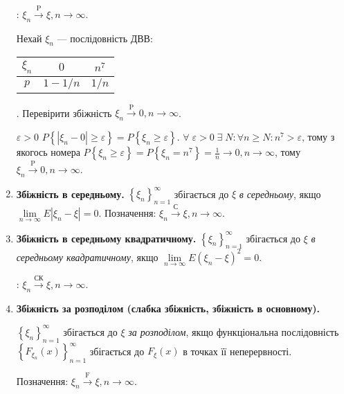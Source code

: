 \begin{enumerate}
    : $\xi_n \overset{\mathrm{P}}{\longrightarrow} \xi, n \to \infty$.
    \begin{example}
        Нехай $\xi_n$ --- послідовність ДВВ: 
        \begin{tabular}{|c|c|c|}
            \hline
            $\xi_n$ & $0$ & $n^7$ \\
            \hline
            $p$ & $1-1/n$ & $1/n$ \\
            \hline
        \end{tabular}.
        Перевірити збіжність $\xi_n \overset{\mathrm{P}}{\longrightarrow} 0, n \to \infty$.
        
         $\varepsilon >0$ $P\left\{|\xi_n -0| \geq \varepsilon\right\} = P\left\{ \xi_n \geq \varepsilon\right\}$.
        $\forall \; \varepsilon >0 \; \exists \; N: \forall n\geq N:n^7 > \varepsilon$, тому з якогось номера
        $P\left\{ \xi_n \geq \varepsilon\right\} = P\left\{ \xi_n = n^7 \right\} = \frac{1}{n} \to 0, n\to\infty$, тому $\xi_n \overset{\mathrm{P}}{\longrightarrow} 0, n \to \infty$.
    \end{example}
    \item \textbf{Збіжність в середньому.}
    \noindent$\left\{ \xi_n\right\}_{n=1}^{\infty}$ збігається до $\xi$ \emph{в середньому},
    якщо $\underset{n \to \infty}{\lim} E|\xi_n - \xi| = 0$.
    Позначення: $\xi_n \overset{\text{С}}{\longrightarrow} \xi, n \to \infty$.
    \item \textbf{Збіжність в середньому квадратичному.}
    \noindent$\left\{ \xi_n\right\}_{n=1}^{\infty}$ збігається до $\xi$ \emph{в середньому квадратичному},
    якщо $\underset{n \to \infty}{\lim} E(\xi_n - \xi)^2 = 0$.
    
    : $\xi_n \overset{\text{СК}}{\longrightarrow} \xi, n \to \infty$.
    \item \textbf{Збіжність за розподілом (слабка збіжність, збіжність в основному).}

    \noindent$\left\{ \xi_n\right\}_{n=1}^{\infty}$ збігається до $\xi$ \emph{за розподілом}, якщо функціональна послідовність
    $\left\{ F_{\xi_n} (x)\right\}_{n=1}^{\infty}$ збігається до $F_{\xi}(x)$ в точках її неперервності.

    Позначення: $\xi_n \overset{\mathrm{F}}{\longrightarrow} \xi, n \to \infty$.


\end{enumerate}
